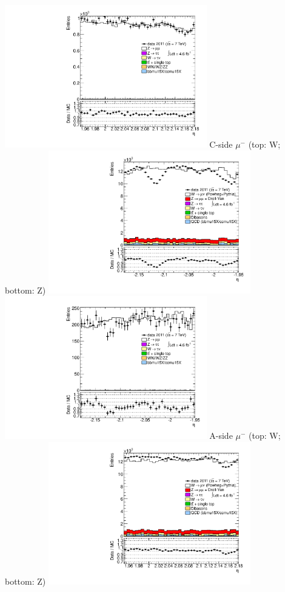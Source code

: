 {\includegraphics[width=0.66\textwidth]{dates/20130306/figures/etaphi/Z_10_A_stack_lP_eta_ALL.pdf} 
\cole
}
 {
\colb[T]
C-side $\mu^{-}$ (top: W; bottom: Z)
\centering
\includegraphics[width=0.66\textwidth]{dates/20130306/figures/etaphi/W_10_C_stack_l_eta_POS} \\
\includegraphics[width=0.66\textwidth]{dates/20130306/figures/etaphi/Ztinv_10_C_stack_lP_eta_ALL.pdf}
A-side $\mu^{-}$ (top: W; bottom: Z)
\centering
\includegraphics[width=0.66\textwidth]{dates/20130306/figures/etaphi/W_10_A_stack_l_eta_POS} \\
}
